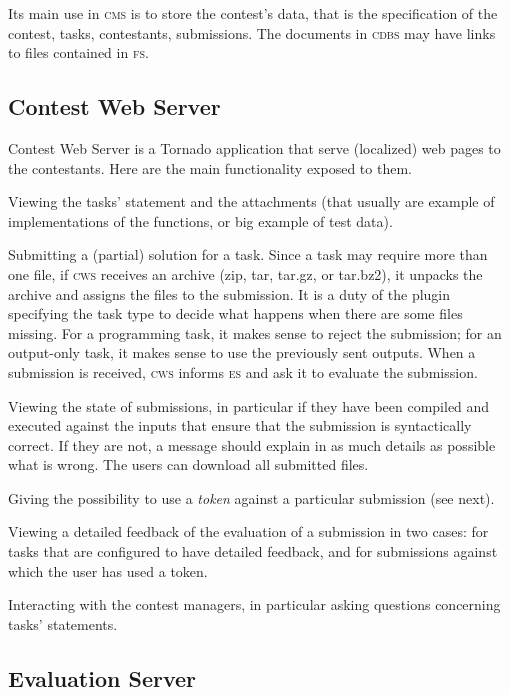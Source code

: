 \documentclass[a4paper,8pt]{amsart}
\newcommand{\CMS}{\textsc{cms}}
\newcommand{\FS}{\textsc{fs}}
\newcommand{\CDBS}{\textsc{cdbs}}
\newcommand{\CWS}{\textsc{cws}}
\newcommand{\ES}{\textsc{es}}
\newenvironment{squishlist}{%
  \begin{list}{\textbullet}%
    { \setlength{\itemsep}{0pt}%
      \setlength{\parsep}{3pt}%
      \setlength{\topsep}{3pt}%
      \setlength{\partopsep}{0pt}%
      \setlength{\leftmargin}{1.5em}%
      \setlength{\labelwidth}{1em}%
      \setlength{\labelsep}{0.5em} }%
}{\end{list}}
\begin{document}
\begin{multicols}{2}
  Its main use in \CMS{} is to store the contest's data, that is the
  specification of the contest, tasks, contestants, submissions. The
  documents in \CDBS{} may have links to files contained in \FS{}.

  \subsection{Contest Web Server}

  Contest Web Server is a Tornado application that serve (localized)
  web pages to the contestants. Here are the main functionality
  exposed to them.
  \begin{squishlist}
  \item Viewing the tasks' statement and the attachments (that usually
    are example of implementations of the functions, or big example of
    test data).
  \item Submitting a (partial) solution for a task. Since a task may
    require more than one file, if \CWS{} receives an archive (zip,
    tar, tar.gz, or tar.bz2), it unpacks the archive and assigns the
    files to the submission. It is a duty of the plugin specifying the
    task type to decide what happens when there are some files
    missing. For a programming task, it makes sense to reject the
    submission; for an output-only task, it makes sense to use the
    previously sent outputs. When a submission is received, \CWS{}
    informs \ES{} and ask it to evaluate the submission.
  \item Viewing the state of submissions, in particular if they have been
    compiled and executed against the inputs that ensure that the
    submission is syntactically correct. If they are not, a message
    should explain in as much details as possible what is wrong. The
    users can download all submitted files.
  \item Giving the possibility to use a \emph{token\/} against a
    particular submission (see next).
  \item Viewing a detailed feedback of the evaluation of a submission
    in two cases: for tasks that are configured to have detailed
    feedback, and for submissions against which the user has used a
    token.
  \item Interacting with the contest managers, in particular asking
    questions concerning tasks' statements.
  \end{squishlist}

  \subsection{Evaluation Server}


\end{multicols}
\end{document}
